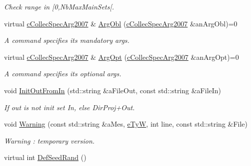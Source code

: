 \begin{DoxyCompactItemize}
\begin{DoxyCompactList}\small\item\em Check range in \mbox{[}0,Nb\+Max\+Main\+Sets\mbox{[}. \end{DoxyCompactList}\item 
virtual \hyperlink{classMMVII_1_1cCollecSpecArg2007}{c\+Collec\+Spec\+Arg2007} \& \hyperlink{classMMVII_1_1cMMVII__Appli_a1ef6d49e115140e2f1e4960a70171c65}{Arg\+Obl} (\hyperlink{classMMVII_1_1cCollecSpecArg2007}{c\+Collec\+Spec\+Arg2007} \&an\+Arg\+Obl)=0\hypertarget{classMMVII_1_1cMMVII__Appli_a1ef6d49e115140e2f1e4960a70171c65}{}\label{classMMVII_1_1cMMVII__Appli_a1ef6d49e115140e2f1e4960a70171c65}

\begin{DoxyCompactList}\small\item\em A command specifies its mandatory args. \end{DoxyCompactList}\item 
virtual \hyperlink{classMMVII_1_1cCollecSpecArg2007}{c\+Collec\+Spec\+Arg2007} \& \hyperlink{classMMVII_1_1cMMVII__Appli_ab7a91471c89643421bc3c049a2ce4213}{Arg\+Opt} (\hyperlink{classMMVII_1_1cCollecSpecArg2007}{c\+Collec\+Spec\+Arg2007} \&an\+Arg\+Opt)=0\hypertarget{classMMVII_1_1cMMVII__Appli_ab7a91471c89643421bc3c049a2ce4213}{}\label{classMMVII_1_1cMMVII__Appli_ab7a91471c89643421bc3c049a2ce4213}

\begin{DoxyCompactList}\small\item\em A command specifies its optional args. \end{DoxyCompactList}\item 
void \hyperlink{classMMVII_1_1cMMVII__Appli_ab818258cd42ef11f004bf6ade212df6c}{Init\+Out\+From\+In} (std\+::string \&a\+File\+Out, const std\+::string \&a\+File\+In)\hypertarget{classMMVII_1_1cMMVII__Appli_ab818258cd42ef11f004bf6ade212df6c}{}\label{classMMVII_1_1cMMVII__Appli_ab818258cd42ef11f004bf6ade212df6c}

\begin{DoxyCompactList}\small\item\em If out is not init set In, else Dir\+Proj+\+Out. \end{DoxyCompactList}\item 
void \hyperlink{classMMVII_1_1cMMVII__Appli_ad3b623a3dc9c2bda68f696ce40d80826}{Warning} (const std\+::string \&a\+Mes, \hyperlink{MMVII__enums_8h_acc74b23f8d3b9e81b34fc60daf1c858b}{e\+TyW}, int line, const std\+::string \&File)
\begin{DoxyCompactList}\small\item\em Warning \+: temporary version. \end{DoxyCompactList}\item 
virtual int \hyperlink{classMMVII_1_1cMMVII__Appli_ae730fa87b2c7ef3a325f935eb5de7b73}{Def\+Seed\+Rand} ()\hypertarget{classMMVII_1_1cMMVII__Appli_ae730fa87b2c7ef3a325f935eb5de7b73}{}\label{classMMVII_1_1cMMVII__Appli_ae730fa87b2c7ef3a325f935eb5de7b73}


\end{DoxyCompactItemize}
